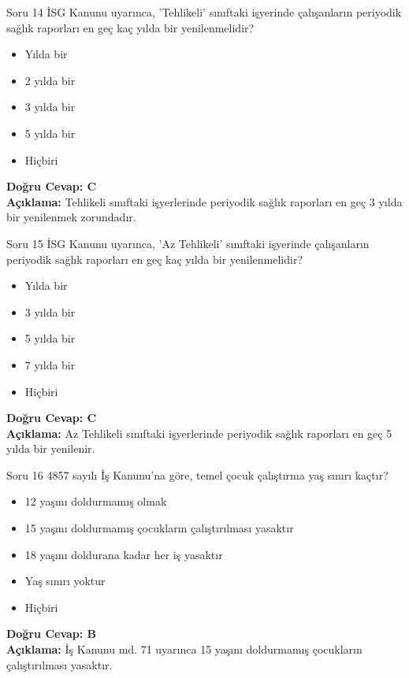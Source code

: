 \documentclass[12pt,a4paper]{article}
\begin{document}
\begin{testcard}{Soru 14}
    İSG Kanunu uyarınca, 'Tehlikeli' sınıftaki işyerinde çalışanların periyodik sağlık raporları en geç kaç yılda bir yenilenmelidir?
    \begin{itemize}
        \item[A)] Yılda bir
        \item[B)] 2 yılda bir
        \item[C)] 3 yılda bir
        \item[D)] 5 yılda bir
        \item[E)] Hiçbiri
    \end{itemize}
    \tcblower
    \textbf{Doğru Cevap: C} \\
    \textbf{Açıklama:} Tehlikeli sınıftaki işyerlerinde periyodik sağlık raporları en geç 3 yılda bir yenilenmek zorundadır.
\end{testcard}

\begin{testcard}{Soru 15}
    İSG Kanunu uyarınca, 'Az Tehlikeli' sınıftaki işyerinde çalışanların periyodik sağlık raporları en geç kaç yılda bir yenilenmelidir?
    \begin{itemize}
        \item[A)] Yılda bir
        \item[B)] 3 yılda bir
        \item[C)] 5 yılda bir
        \item[D)] 7 yılda bir
        \item[E)] Hiçbiri
    \end{itemize}
    \tcblower
    \textbf{Doğru Cevap: C} \\
    \textbf{Açıklama:} Az Tehlikeli sınıftaki işyerlerinde periyodik sağlık raporları en geç 5 yılda bir yenilenir.
\end{testcard}

\begin{testcard}{Soru 16}
    4857 sayılı İş Kanunu'na göre, temel çocuk çalıştırma yaş sınırı kaçtır?
    \begin{itemize}
        \item[A)] 12 yaşını doldurmamış olmak
        \item[B)] 15 yaşını doldurmamış çocukların çalıştırılması yasaktır
        \item[C)] 18 yaşını doldurana kadar her iş yasaktır
        \item[D)] Yaş sınırı yoktur
        \item[E)] Hiçbiri
    \end{itemize}
    \tcblower
    \textbf{Doğru Cevap: B} \\
    \textbf{Açıklama:} İş Kanunu md. 71 uyarınca 15 yaşını doldurmamış çocukların çalıştırılması yasaktır.
\end{testcard}
\end{document}
